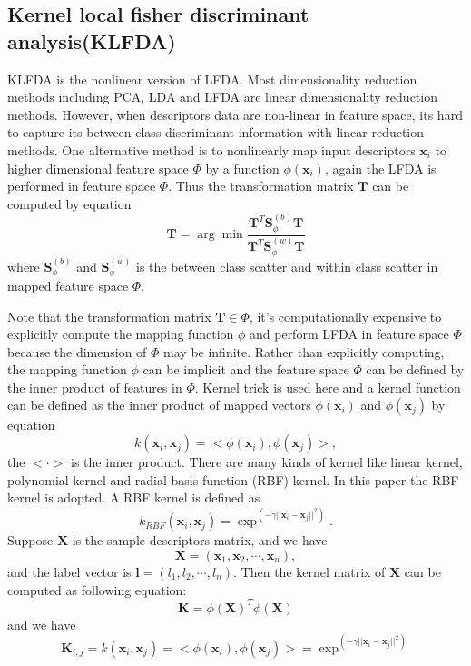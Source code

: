 \subsection{Kernel local fisher discriminant analysis(KLFDA)}

KLFDA  \cite{KLFDA} is the nonlinear version of LFDA. Most dimensionality reduction methods including PCA, LDA and LFDA are linear dimensionality reduction methods. However, when descriptors data are non-linear in feature space, its hard to capture its between-class discriminant information with linear reduction methods. One alternative method is to nonlinearly map input descriptors $\bm{x}_i$ to higher dimensional feature space $\Phi$ by a function $\phi(\bm{x}_i)$, again the LFDA is performed in feature space $\Phi$. Thus the transformation matrix $\bm{T}$ can be computed by equation
\begin{equation}
\bm{T} = \arg \min \frac{\bm{T}^T\bm{S}^{(b)}_{\phi}\bm{T}}{\bm{T}^T\bm{S}^{(w)}_{\phi}\bm{T}}
\end{equation}
where $\bm{S}^{(b)}_{\phi}$ and $\bm{S}^{(w)}_{\phi}$ is the between class scatter and within class scatter in mapped feature space $\Phi$.

Note that the transformation matrix $\bm{T} \in \Phi$, it's computationally expensive to explicitly compute the mapping function $\phi$ and perform LFDA in feature space $\Phi$ because the dimension of $\Phi$ may be infinite. Rather than explicitly computing, the mapping function $\phi$ can be implicit and the feature space $\Phi$ can be defined by the inner product of features in $\Phi$. Kernel trick is used here and a kernel function can be defined as the inner product of mapped vectors $\phi(\bm{x}_i)$ and $\phi(\bm{x}_j)$ by equation
 \begin{equation}
 k(\bm{x}_i,\bm{x}_j) = <\phi(\bm{x}_i),\phi(\bm{x}_j)>,
 \end{equation}
 the $< \cdot >$ is the inner product. There are many kinds of kernel like linear kernel, polynomial kernel and radial basis function (RBF) kernel. In this paper the RBF kernel is adopted. A RBF kernel is defined as 
 \begin{equation}
 k_{RBF}(\bm{x}_i,\bm{x}_j) = \exp^{(-\gamma||\bm{x}_i-\bm{x}_j||^2)}. 
 \end{equation}
Suppose $\bm{X}$ is the sample descriptors matrix, and we have
\begin{equation}
\bm{X} = (\bm{x}_1, \bm{x}_2,\cdots, \bm{x}_n), 
\end{equation}
and the label vector is $\bm{l} = (l_1, l_2, \cdots, l_n)$. Then the kernel matrix of $\bm{X}$ can be computed as following equation:
\begin{equation}
\bm{K} =  \phi(\bm{X})^T \phi(\bm{X})
\end{equation}
and we have 
\begin{equation}
\bm{K}_{i,j} =  k(\bm{x}_i,\bm{x}_j) = <\phi(\bm{x}_i),\phi(\bm{x}_j)> =  \exp^{(-\gamma||\bm{x}_i-\bm{x}_j||^2)}
\end{equation}

